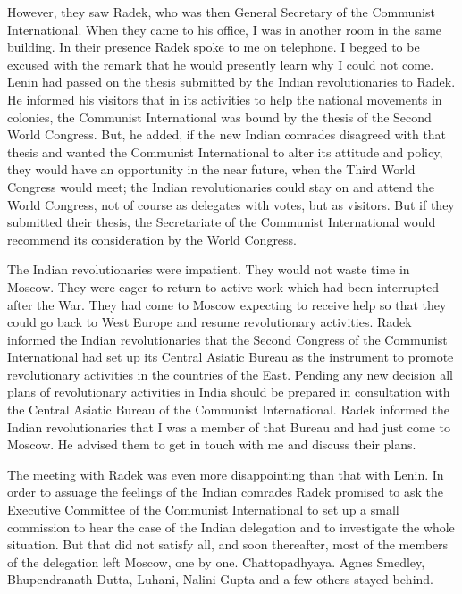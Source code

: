 However, they saw Radek, who was then General Secretary of the Communist International. When they came to his office, I was in another room in the same building. In their presence Radek spoke to me on telephone. I begged to be excused with the remark that he would presently learn why I could not come. Lenin had passed on the thesis submitted by the Indian revolutionaries to Radek. He informed his visitors that in its activities to help the national movements in colonies, the Communist International was bound by the thesis of the Second World Congress. But, he added, if the new Indian comrades disagreed with that thesis and wanted the Communist International to alter its attitude and policy, they would have an opportunity in the near future, when the Third World Congress would meet; the Indian revolutionaries could stay on and attend the World Congress, not of course as delegates with votes, but as visitors. But if they submitted their thesis, the Secretariate of the Communist International would recommend its consideration by the World Congress. 

The Indian revolutionaries were impatient. They would not waste time in Moscow. They were eager to return to active work which had been interrupted after the War. They had come to Moscow expecting to receive help so that they could go back to West Europe and resume revolutionary activities. Radek informed the Indian revolutionaries that the Second Congress 
of the Communist International had set up its Central Asiatic Bureau as the instrument to promote revolutionary activities in the countries of the East. Pending any new decision all plans of revolutionary activities in India should be prepared in consultation with the Central Asiatic Bureau of the Communist International. Radek informed the Indian revolutionaries that I was a member of that Bureau and had just come to Moscow. He advised them to get in touch with me and discuss their plans. 

The meeting with Radek was even more disappointing than that with Lenin. In order to assuage the feelings of the Indian comrades Radek promised to ask the Executive Committee of the Communist International to set up a small commission to hear the case of the Indian delegation and to investigate the whole situation. But that did not satisfy all, and soon thereafter, most of the members of the delegation left Moscow, one by one. Chattopadhyaya. Agnes Smedley, Bhupendranath Dutta, Luhani, Nalini Gupta and a few others stayed behind. 

